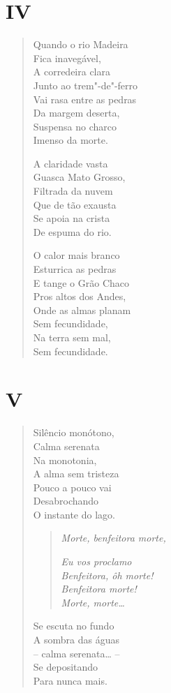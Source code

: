 \pagebreak
\section*{IV}

\begin{verse}
Quando o rio Madeira\\
Fica inavegável,\\
A corredeira clara\\
Junto ao trem"-de"-ferro\\
Vai rasa entre as pedras\\
Da margem deserta,\\
Suspensa no charco\\
Imenso da morte.

A claridade vasta\\
Guasca Mato Grosso,\\
Filtrada da nuvem\\
Que de tão exausta\\
Se apoia na crista\\
De espuma do rio.

O calor mais branco\\
Esturrica as pedras\\
E tange o Grão Chaco\\
Pros altos dos Andes,\\
Onde as almas planam\\
Sem fecundidade,\\
Na terra sem mal,\\
Sem fecundidade.
\end{verse}

\pagebreak
\section*{V}

\begin{verse}
Silêncio monótono,\\
Calma serenata\\
Na monotonia,\\
A alma sem tristeza\\
Pouco a pouco vai\\
Desabrochando\\
O instante do lago.

\begin{quote}
\forceindent\emph{Morte, benfeitora morte, }

\emph{Eu vos proclamo }\\
\emph{Benfeitora, ôh morte! }\\
\emph{Benfeitora morte! }\\
\emph{Morte, morte\ldots{}}
\end{quote}

Se escuta no fundo\\
A sombra das águas\\
-- calma serenata\ldots{} --\\
Se depositando\\
Para nunca mais.
\end{verse}

